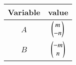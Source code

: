 \begin{tabular}[12pt]{ |c| c|}
    \hline
    \textbf{Variable} & \textbf{value}\\ 
    \hline
    \textbf{$A$} & $\begin{pmatrix}m\\-n\end{pmatrix}$\\
    \hline
 \textbf{$B$} & $\begin{pmatrix}-m\\n\end{pmatrix}$\\
    \hline
    \end{tabular}